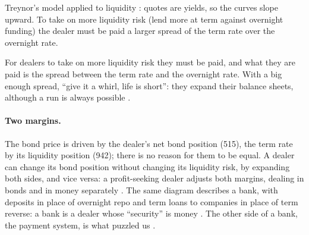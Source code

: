 \begin{paracol}{2}
\begin{nfigure}
\caption{Treynor's model applied to liquidity : quotes are yields, so the curves slope upward. To take on more liquidity risk (lend more at term
against overnight funding) the dealer must be paid a larger spread of the term rate over the overnight rate.}\label{fig:bl-liqtreynor}
\end{nfigure}

\begin{proposition}
For dealers to take on more liquidity risk they must be paid, and what they are paid is the spread between the term rate and the overnight rate. With a big enough spread,
``give it a whirl, life is short'': they expand their balance sheets, although a run is always possible .
\end{proposition}

\paragraph{Two margins.} The bond price is driven by the dealer's net bond position (515), the term rate by its liquidity position (942); there is no reason for them to be equal.
A dealer can change its bond position without changing its liquidity risk, by expanding both sides, and vice versa: a profit-seeking dealer adjusts both margins, dealing in
bonds and in money separately . The same diagram describes a bank, with deposits in place of overnight
repo and term loans to companies in place of term reverse: a bank is a dealer whose ``security'' is money . The other side of a bank, the payment system,
is what puzzled us .


\end{paracol}
